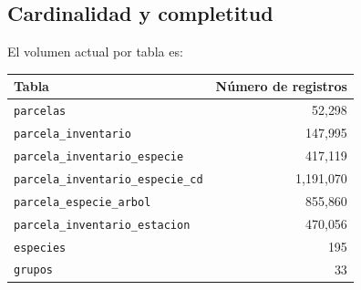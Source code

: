 \subsection*{Cardinalidad y completitud}

El volumen actual por tabla es:
\begin{center}
\begin{tabular}{l r}
\toprule
\textbf{Tabla} & \textbf{Número de registros} \\
\midrule
\texttt{parcelas} & 52{,}298 \\
\texttt{parcela\_inventario} & 147{,}995 \\
\texttt{parcela\_inventario\_especie} & 417{,}119 \\
\texttt{parcela\_inventario\_especie\_cd} & 1{,}191{,}070 \\
\texttt{parcela\_especie\_arbol} & 855{,}860 \\
\texttt{parcela\_inventario\_estacion} & 470{,}056 \\
\texttt{especies} & 195 \\
\texttt{grupos} & 33 \\
\bottomrule
\end{tabular}
\end{center}


